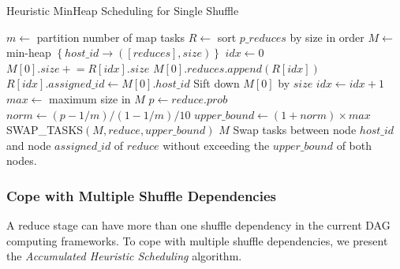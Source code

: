 \begin{minipage}{0.95\columnwidth}
	\begin{algorithm}[H]
	\caption{Heuristic MinHeap Scheduling for Single Shuffle}
	\label{hminheap}
		\begin{algorithmic}[1]
		\small
			\State $m\gets$ partition number of map tasks
			\State $R\gets$ sort $p\_reduces$ by size in  order
			\State $M\gets$ min-heap $\left\{ host\_id \rightarrow \left( \left[ reduces \right], size \right) \right\}$
			\State $idx\gets 0$
			\State $M\left[0\right].size \mathrel{+}= R\left[idx\right].size$
			\State $M\left[0\right].reduces.append\left(R\left[idx\right]\right)$
			\State $R\left[idx\right].assigned\_id \gets M \left[0\right].host\_id$
			\State Sift down $M\left[0\right]$ by $size$
			\State $idx\gets idx+1$
			\EndWhile
			\State $max\gets$ maximum size in $M$
					\State $p\gets reduce.prob$
					\State $norm\gets \left(p-1/m\right)/\left(1-1/m\right)/10$
					\State $upper\_bound \gets \left(1 + norm\right) \times max$
					\State SWAP\_TASKS$\left(M, reduce, upper\_bound\right)$
				\EndIf
			\EndFor\newline
			\Return $M$
		\EndProcedure
			\State Swap tasks between node $host\_id$ and node $assigned\_id$
			\State of $reduce$ without exceeding the $upper\_bound$
			\State of both nodes.\newline
			\Return
		\EndProcedure
		\end{algorithmic}
	\end{algorithm}
	\end{minipage}

\subsubsection{Cope with Multiple Shuffle Dependencies}
{\color{black}
A reduce stage can have more than one shuffle dependency in the current DAG computing frameworks.
To cope with multiple shuffle dependencies, we present the \textit{Accumulated Heuristic Scheduling} algorithm.
}

